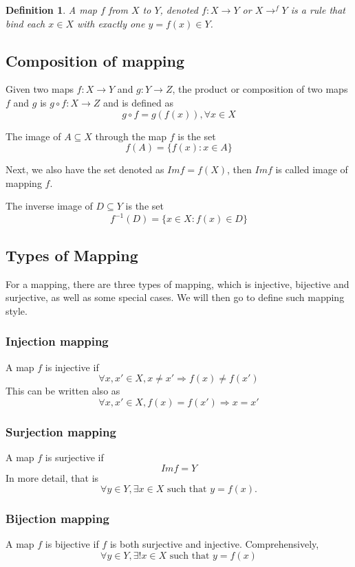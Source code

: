 \documentclass{book}
\newtheorem{Definition}{Definition}[section]
\numberwithin{identity}{subsection}
\numberwithin{Rule}{subsection}
\numberwithin{Theorem}{subsection}
\numberwithin{Definition}{subsection}
\begin{document}
\begin{Definition}
    A map $f$ from $X$ to $Y$, denoted $f: X \longrightarrow Y$ or $X \longrightarrow^{f} Y$ is a rule that bind each $x \in X$ with exactly one $y = f(x) \in Y$.
\end{Definition}

\subsection{Composition of mapping}
Given two maps $f: X \longrightarrow Y$ and $g: Y \longrightarrow Z$, the product or composition of two maps $f$ and $g$ is $g \circ f: X \longrightarrow Z$ and is defined as $$g \circ f = g(f(x)), \forall x \in X$$

The image of $A \subseteq X$ through the map $f$ is the set $$f(A)= \{f(x):x\in A\}$$

Next, we also have the set denoted as $Imf=f(X)$, then $Imf$ is called image of mapping $f$. 

The inverse image of $D \subseteq Y$ is the set $$f^{-1}(D)=\{x\in X: f(x)\in D\}$$

\subsection{Types of Mapping}
For a mapping, there are three types of mapping, which is injective, bijective and surjective, as well as some special cases. We will then go to define such mapping style. 

\subsubsection{Injection mapping}
A map $f$ is injective if $$\forall x , x' \in X, x \neq x' \Rightarrow f(x)\neq f(x')$$
This can be written also as $$\forall x, x' \in X, f(x)=f(x')\Rightarrow x = x'$$
\subsubsection{Surjection mapping}
A map $f$ is surjective if $$Imf=Y$$
In more detail, that is $$\forall y\in Y,\exists x\in X{\text{ such that }}y=f(x).$$
\subsubsection{Bijection mapping}
A map $f$ is bijective if $f$ is both surjective and injective. Comprehensively, $$\displaystyle \forall y\in Y,\exists !x\in X{\text{ such that }}y=f(x)$$
\end{document}
